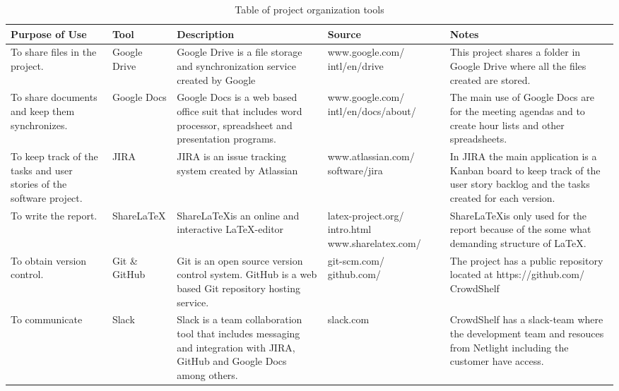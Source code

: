 \begin{table}[]
\centering
\begin{tabular}{|L{2cm}|L{2cm}|L{4cm}|L{3cm}|L{4cm}|}
\hline
\textbf{Purpose of Use} & \textbf{Tool} & \textbf{Description} & \textbf{Source} & \textbf{Notes} \\ \hline
To share files in the project. & 
Google Drive & Google Drive is a file storage and synchronization service created by Google & 
www.google.com/ intl/en/drive & 
This project shares a folder in Google Drive where all the files created are stored. \\
\hline
To share documents and keep them synchronizes. & 
Google Docs & 
Google Docs is a web based office suit that includes word processor, spreadsheet and presentation programs. & 
www.google.com/ intl/en/docs/about/ & 
The main use of Google Docs are for the meeting agendas and to create hour lists and other spreadsheets. \\
\hline
To keep track of the tasks and user stories of the software project. & 
JIRA & 
JIRA is an issue tracking system created by Atlassian & www.atlassian.com/ software/jira & 
In JIRA the main application is a Kanban board to keep track of the user story backlog and the tasks created for each version. \\ \hline

To write the report. & 
Share\LaTeX & Share\LaTeX is an online and interactive \LaTeX-editor & 
latex-project.org/ intro.html www.sharelatex.com/ & Share\LaTeX is only used for the report because of the some what demanding structure of \LaTeX. \\\hline

To obtain version control. & 
Git \& GitHub & 
Git is an open source version control system. GitHub is a web based Git repository hosting service. & 
git-scm.com/ github.com/ & 
The project has a public repository located at https://github.com/ CrowdShelf \\\hline
To communicate & 
Slack & 
Slack is a team collaboration tool that includes messaging and integration with JIRA, GitHub and Google Docs among others. & slack.com & 
CrowdShelf has a slack-team where the development team and resouces from Netlight including the customer have access.\\ \hline
\end{tabular}
\caption{Table of project organization tools}
\label{org-tools}
\end{table}